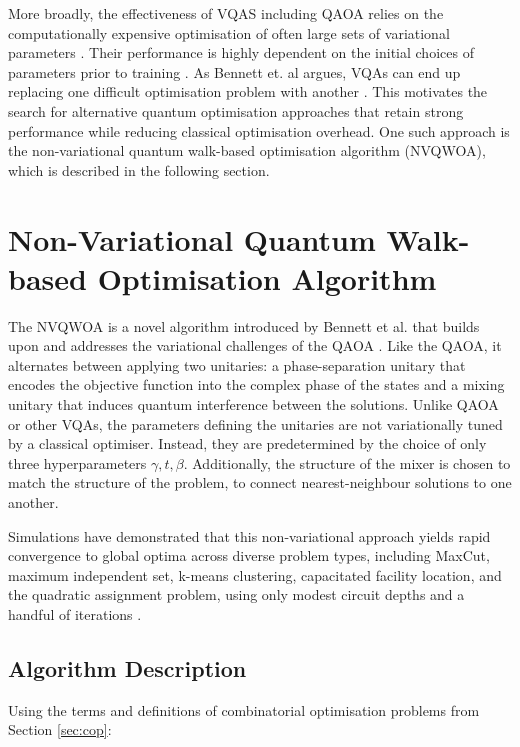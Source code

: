 More broadly, the effectiveness of VQAS including QAOA relies on the computationally expensive optimisation of often large sets of variational parameters \cite{QAOA-optimiser}. Their performance is highly dependent on the initial choices of parameters prior to training \cite{QAOA-review}. As Bennett et. al argues, VQAs can end up replacing one difficult optimisation problem with another \cite{bennett2024nonvariational}. This motivates the search for alternative quantum optimisation approaches that retain strong performance while reducing classical optimisation overhead. One such approach is the non-variational quantum walk-based optimisation algorithm (NVQWOA), which is described in the following section.

\section{Non-Variational Quantum Walk-based Optimisation Algorithm}\label{sec:NVQWOA}
The NVQWOA is a novel algorithm introduced by Bennett et al. that builds upon and addresses the variational challenges of the QAOA \cite{bennett2024nonvariational,bennett2024analysisnonvariationalquantumwalkbased}. 
Like the QAOA, it alternates between applying two unitaries: a phase-separation unitary that encodes the objective function into the complex phase of the states and a mixing unitary that induces quantum interference between the solutions. Unlike QAOA or other VQAs, the parameters defining the unitaries are not variationally tuned by a classical optimiser. Instead, they are predetermined by the choice of only three hyperparameters $\gamma, t, \beta$. Additionally, the structure of the mixer is chosen to match the structure of the problem, to connect nearest-neighbour solutions to one another.

Simulations have demonstrated that this non-variational approach yields rapid convergence to global optima across diverse problem types, including MaxCut, maximum independent set, k-means clustering, capacitated facility location, and the quadratic assignment problem, using only modest circuit depths and a handful of iterations \cite{bennett2024analysisnonvariationalquantumwalkbased}.

\subsection{Algorithm Description}
Using the terms and definitions of combinatorial optimisation problems from Section \ref{sec:cop}:

